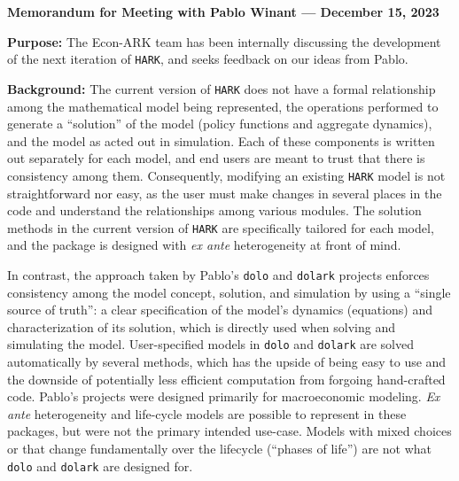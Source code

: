 \documentclass[12pt,pdftex,letterpaper]{article}
\begin{document}
\begin{center}
	\textbf{Memorandum for Meeting with Pablo Winant --- December 15, 2023}
\end{center}

\noindent \textbf{Purpose:} The Econ-ARK team has been internally discussing the development of the next iteration of \texttt{HARK}, and seeks feedback on our ideas from Pablo.

\vspace{0.35cm}

\noindent \textbf{Background:} The current version of \texttt{HARK} does not have a formal relationship among the mathematical model being represented, the operations performed to generate a ``solution'' of the model (policy functions and aggregate dynamics), and the model as acted out in simulation. Each of these components is written out separately for each model, and end users are meant to trust that there is consistency among them. Consequently, modifying an existing \texttt{HARK} model is not straightforward nor easy, as the user must make changes in several places in the code and understand the relationships among various modules. The solution methods in the current version of \texttt{HARK} are specifically tailored for each model, and the package is designed with \textit{ex ante} heterogeneity at front of mind.

In contrast, the approach taken by Pablo's \texttt{dolo} and \texttt{dolark} projects enforces consistency among the model concept, solution, and simulation by using a ``single source of truth'': a clear specification of the model's dynamics (equations) and characterization of its solution, which is directly used when solving and simulating the model. User-specified models in \texttt{dolo} and \texttt{dolark} are solved automatically by several methods, which has the upside of being easy to use and the downside of potentially less efficient computation from forgoing hand-crafted code. Pablo's projects were designed primarily for macroeconomic modeling. \textit{Ex ante} heterogeneity and life-cycle models are possible to represent in these packages, but were not the primary intended use-case. Models with mixed choices or that change fundamentally over the lifecycle (``phases of life'') are not what \texttt{dolo} and \texttt{dolark} are designed for.

\vspace{0.35cm}
\end{document}
